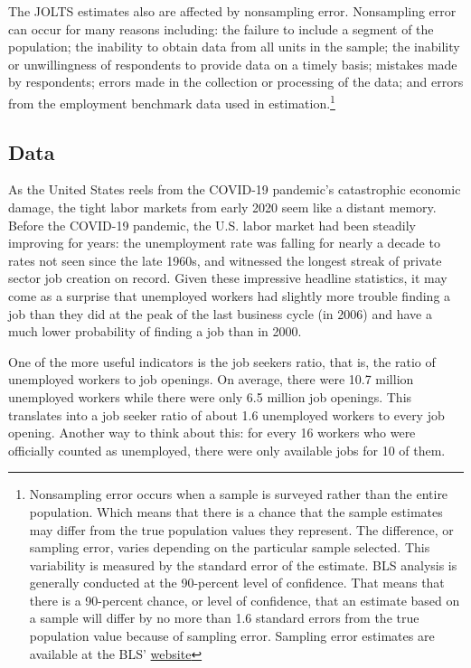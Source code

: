 \documentclass[
  11pt,
]{article}
\begin{document}
The JOLTS estimates also are affected by nonsampling error. Nonsampling
error can occur for many reasons including: the failure to include a
segment of the population; the inability to obtain data from all units
in the sample; the inability or unwillingness of respondents to provide
data on a timely basis; mistakes made by respondents; errors made in the
collection or processing of the data; and errors from the employment
benchmark data used in estimation.\footnote{Nonsampling error occurs
  when a sample is surveyed rather than the entire population. Which
  means that there is a chance that the sample estimates may differ from
  the true population values they represent. The difference, or sampling
  error, varies depending on the particular sample selected. This
  variability is measured by the standard error of the estimate. BLS
  analysis is generally conducted at the 90-percent level of confidence.
  That means that there is a 90-percent chance, or level of confidence,
  that an estimate based on a sample will differ by no more than 1.6
  standard errors from the true population value because of sampling
  error. Sampling error estimates are available at the BLS'
  \href{https://www.bls.gov/jlt/jolts_median_standard_errors.htm}{website}}

\hypertarget{data}{%
\subsection{Data}\label{data}}

As the United States reels from the COVID-19 pandemic's catastrophic
economic damage, the tight labor markets from early 2020 seem like a
distant memory. Before the COVID-19 pandemic, the U.S. labor market had
been steadily improving for years: the unemployment rate was falling for
nearly a decade to rates not seen since the late 1960s, and witnessed
the longest streak of private sector job creation on record. Given these
impressive headline statistics, it may come as a surprise that
unemployed workers had slightly more trouble finding a job than they did
at the peak of the last business cycle (in 2006) and have a much lower
probability of finding a job than in 2000.

One of the more useful indicators is the job seekers ratio, that is, the
ratio of unemployed workers to job openings. On average, there were 10.7
million unemployed workers while there were only 6.5 million job
openings. This translates into a job seeker ratio of about 1.6
unemployed workers to every job opening. Another way to think about
this: for every 16 workers who were officially counted as unemployed,
there were only available jobs for 10 of them.
\end{document}
